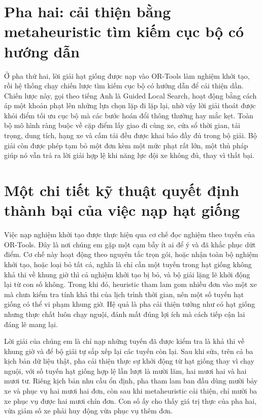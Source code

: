 \documentclass[12pt,a4paper,oneside]{report}
\begin{document}
\section{Pha hai: cải thiện bằng metaheuristic tìm kiếm cục bộ có hướng dẫn}
Ở pha thứ hai, lời giải hạt giống được nạp vào OR-Tools làm nghiệm khởi tạo, rồi hệ thống chạy chiến lược tìm kiếm cục bộ có hướng dẫn để cải thiện dần. Chiến lược này, gọi theo tiếng Anh là Guided Local Search, hoạt động bằng cách áp một khoản phạt lên những lựa chọn lặp đi lặp lại, nhờ vậy lời giải thoát được khỏi điểm tối ưu cục bộ mà các bước hoán đổi thông thường hay mắc kẹt. Toàn bộ mô hình ràng buộc về cặp điểm lấy giao đi cùng xe, cửa sổ thời gian, tải trọng, dung tích, hạng xe và cấm tải đều được khai báo đầy đủ trong bộ giải. Bộ giải còn được phép tạm bỏ một đơn kèm một mức phạt rất lớn, một thủ pháp giúp nó vẫn trả ra lời giải hợp lệ khi năng lực đội xe không đủ, thay vì thất bại.

\section{Một chi tiết kỹ thuật quyết định thành bại của việc nạp hạt giống}
Việc nạp nghiệm khởi tạo được thực hiện qua cơ chế đọc nghiệm theo tuyến của OR-Tools. Đây là nơi chúng em gặp một cạm bẫy ít ai để ý và đã khắc phục dứt điểm. Cơ chế này hoạt động theo nguyên tắc trọn gói, hoặc nhận toàn bộ nghiệm khởi tạo, hoặc loại bỏ tất cả, nghĩa là chỉ cần một tuyến trong hạt giống không khả thi về khung giờ thì cả nghiệm khởi tạo bị bỏ, và bộ giải lặng lẽ khởi động lại từ con số không. Trong khi đó, heuristic tham lam gom nhiều đơn vào một xe mà chưa kiểm tra tính khả thi của lịch trình thời gian, nên một số tuyến hạt giống có thể vi phạm khung giờ. Hệ quả là pha cải thiện tưởng như có hạt giống nhưng thực chất luôn chạy nguội, đánh mất đúng lợi ích mà cách tiếp cận lai đáng lẽ mang lại.

Lời giải của chúng em là chỉ nạp những tuyến đã được kiểm tra là khả thi về khung giờ và để bộ giải tự sắp xếp lại các tuyến còn lại. Sau khi sửa, trên cả ba kịch bản dữ liệu thật, pha cải thiện thực sự khởi động từ hạt giống thay vì chạy nguội, với số tuyến hạt giống hợp lệ lần lượt là mười lăm, hai mươi hai và hai mươi tư. Riêng kịch bản nhu cầu ổn định, pha tham lam ban đầu dùng mười bảy xe và phục vụ hai mươi hai đơn, còn sau khi metaheuristic cải thiện, chỉ mười ba xe phục vụ được hai mươi chín đơn. Con số ấy cho thấy giá trị thực của pha hai, vừa giảm số xe phải huy động vừa phục vụ thêm đơn.
\end{document}

